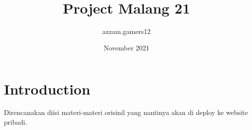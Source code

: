 \documentclass{article}
\title{Project Malang 21}
\author{azzam.gamers12 }
\date{November 2021}
\begin{document}
\maketitle

\section{Introduction}
Direncanakan diisi materi-materi orisinil yang nantinya akan di deploy ke website pribadi.
\end{document}
